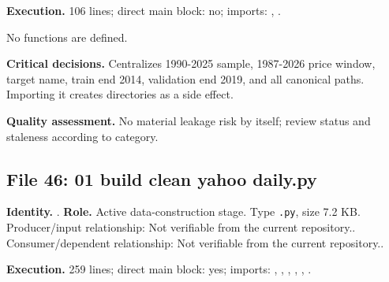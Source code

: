 \documentclass[
  11pt,
  a4paper]{article}
\begin{document}
\textbf{Execution.} 106 lines; direct main block: no; imports:
, .

No functions are defined.

\textbf{Critical decisions.} Centralizes 1990-2025 sample, 1987-2026
price window, target name, train end 2014, validation end 2019, and all
canonical paths. Importing it creates directories as a side effect.

\textbf{Quality assessment.} No material leakage risk by itself; review
status and staleness according to category.

\subsection{File 46: 01 build clean yahoo
daily.py}\label{file-4023338802399964139}

\textbf{Identity.} .
\textbf{Role.} Active data-construction stage. Type \texttt{.py}, size
7.2 KB. Producer/input relationship: Not verifiable from the current
repository.. Consumer/dependent relationship: Not verifiable from the
current repository..

\textbf{Execution.} 259 lines; direct main block: yes; imports:
, ,
,
, , .
\end{document}
